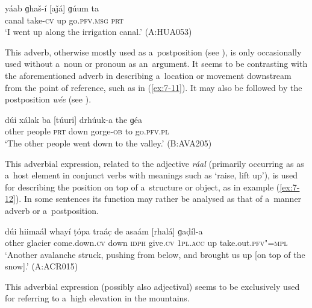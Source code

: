\begin{exe}
\ex
\label{ex:7-10}
\gll yáab ɡhaš-í [aǰá] ɡúum ta  \\
canal take-\textsc{cv} up go.\textsc{pfv.msg} \textsc{prt} \\
\glt `I went up along the irrigation canal.' (A:HUA053)
\end{exe}

 This adverb, otherwise mostly used as a~postposition (see ), is only occasionally used without a~noun or pronoun as an~argument. It seems to be contrasting with the aforementioned adverb in describing a~location or movement downstream from the point of reference, such as in (\ref{ex:7-11}). It may also be followed by the postposition \textit{wée} (see ). 

\begin{exe}
\ex
\label{ex:7-11}
\gll dúi xálak ba [túuri] drhúuk-a the ɡéa  \\
other people \textsc{prt} down gorge-\textsc{ob}  to go.\textsc{pfv.pl} \\
\glt `The other people went down to the valley.' (B:AVA205)
\end{exe}

 This adverbial expression, related to the adjective \textit{ráal} (primarily occurring as as a~host element in conjunct verbs with meanings such as `raise, lift up'), is used for describing the position on top of a~structure or object, as in example (\ref{ex:7-12}). In some sentences its function may rather be analysed as that of a~manner adverb or a~postposition.

\begin{exe}
\ex
\label{ex:7-12}
\gll dúi hiimaál whayí ṭópa traác̣ de asaám  [rhalá] ɡaḍíl-a \\
other glacier come.down.\textsc{cv} down \textsc{idph} give.\textsc{cv} \textsc{1pl.acc} up take.out.\textsc{pfv"=mpl} \\
\glt `Another avalanche struck, pushing from below, and brought us up [on top of the snow].' (A:ACR015)
\end{exe}

 This adverbial expression (possibly also adjectival) seems to be exclusively used for referring to a~high elevation in the mountains.


